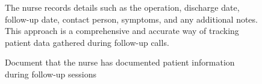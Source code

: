 \documentclass[12pt,oneside,openright,a4paper]{cpe-english-project}
\begin{document}
      \begin{figure}
        \centering
        \caption{Document that the nurse has documented patient information during follow-up sessions}\label{fig:Interview_4}
        \begin{flushleft}
          \qquad The nurse records details such as the operation, discharge date, follow-up date, contact person, symptoms, and any additional notes. This approach is a comprehensive and accurate way of tracking patient data gathered during follow-up calls. \par
        \end{flushleft}
      \end{figure}
\end{document}
